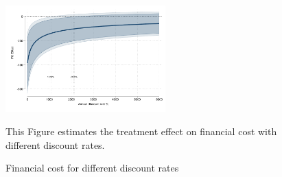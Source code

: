 \documentclass[oneside,11pt]{article}
\begin{document}
    

        

\vspace{3ex}

\begin{figure}[H]
        \caption{Financial cost for different discount rates}
    \label{fc_discount_rates}
    \begin{center}
        \centering
        \includegraphics[width=0.55\textwidth]{Figuras/discount_effect.pdf}
    \end{center}
     \scriptsize This Figure estimates the treatment effect on financial cost with different discount rates.  
\end{figure}
\end{document}
